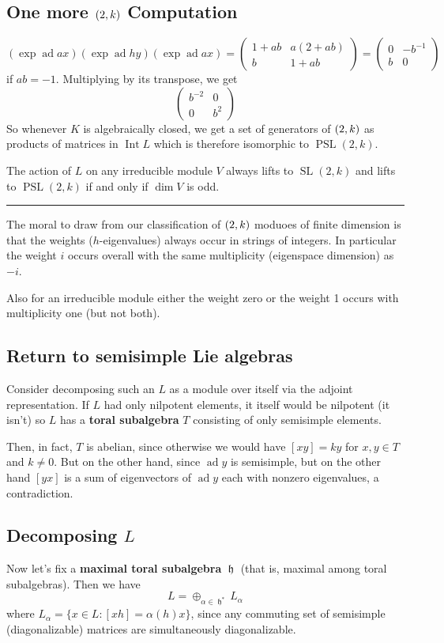 \documentclass[12pt]{article}
\theoremstyle{nonumberbreak}
\theoremstyle{changebreak}
\theoremstyle{nonumberbreak}
\theoremstyle{change}
\newcommand*{\brk}{
\rule{2in}{.1pt}
}
\let\sl\relax
\DeclareMathOperator{\sl}{\mathfrak{sl}}
\DeclareMathOperator{\ad}{ad}
\DeclareMathOperator{\Int}{Int}
\DeclareMathOperator{\h}{\mathfrak{h}}
\begin{document}
\subsection{One more $\sl(2,k)$ Computation}
\[(\exp\ad ax)(\exp\ad hy)(\exp\ad ax)=\begin{pmatrix}
	1+ab & a(2+ab)\\
	b & 1+ab
\end{pmatrix}=\begin{pmatrix}
	0 & -b^{-1}\\
	b & 0
\end{pmatrix}\]
if $ab=-1$. Multiplying by its transpose, we get
\[\begin{pmatrix}
	b^{-2} & 0 \\
	0 & b^2
\end{pmatrix}\]
So whenever $K$ is algebraically closed, we get a set of generators of $\sl(2,k)$ as products of matrices in $\Int L$ which is therefore 
isomorphic to $\operatorname{PSL}(2,k)$.

The action of $L$ on any irreducible module $V$ always lifts to $\operatorname{SL}(2,k)$ and lifts to $\operatorname{PSL}(2,k)$ if and only if $\dim V$ is odd.

\brk

The moral to draw from our classification of $\sl(2,k)$ moduoes of finite dimension is that the weights ($h$-eigenvalues) always occur in strings
of integers. In particular the weight $i$ occurs overall with the same multiplicity (eigenspace dimension) as $-i$.

Also for an irreducible module either the weight zero or the weight 1 occurs with multiplicity one (but not both).

\subsection{Return to semisimple Lie algebras}
Consider decomposing such an $L$ as a module over itself via the adjoint representation. If $L$ had only nilpotent elements, it itself would be nilpotent (it isn't)
so $L$ has a \textbf{toral subalgebra} $T$ consisting of only semisimple elements.

Then, in fact, $T$ is abelian, since otherwise we would have $[xy]=ky$ for $x,y\in T$ and $k\ne 0$.
But on the other hand, since $\ad y$ is semisimple, but on the other hand $[yx]$ is a sum of eigenvectors of $\ad y$
each with nonzero eigenvalues, a contradiction.

\subsection{Decomposing $L$}
Now let's fix a \textbf{maximal toral subalgebra} $\h$ (that is, maximal among toral subalgebras). Then we have
\[L=\oplus_{\alpha\in\h^*}L_\alpha\]
where $L_\alpha=\{x\in L:[xh]=\alpha(h)x\}$, since any commuting set of semisimple (diagonalizable) matrices are simultaneously diagonalizable.
\end{document}
